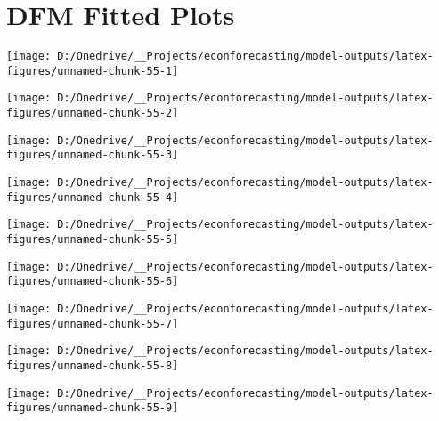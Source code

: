 \documentclass[11pt, letterpaper]{article}\usepackage[]{graphicx}\usepackage[]{color}
\begin{document}
\appendix
\appendixpage
\addappheadtotoc

\section{DFM Fitted Plots}


{\centering \texttt{[image: D:/Onedrive/\_\_Projects/econforecasting/model-outputs/latex-figures/unnamed-chunk-55-1]} 

}




{\centering \texttt{[image: D:/Onedrive/\_\_Projects/econforecasting/model-outputs/latex-figures/unnamed-chunk-55-2]} 

}




{\centering \texttt{[image: D:/Onedrive/\_\_Projects/econforecasting/model-outputs/latex-figures/unnamed-chunk-55-3]} 

}




{\centering \texttt{[image: D:/Onedrive/\_\_Projects/econforecasting/model-outputs/latex-figures/unnamed-chunk-55-4]} 

}




{\centering \texttt{[image: D:/Onedrive/\_\_Projects/econforecasting/model-outputs/latex-figures/unnamed-chunk-55-5]} 

}




{\centering \texttt{[image: D:/Onedrive/\_\_Projects/econforecasting/model-outputs/latex-figures/unnamed-chunk-55-6]} 

}




{\centering \texttt{[image: D:/Onedrive/\_\_Projects/econforecasting/model-outputs/latex-figures/unnamed-chunk-55-7]} 

}




{\centering \texttt{[image: D:/Onedrive/\_\_Projects/econforecasting/model-outputs/latex-figures/unnamed-chunk-55-8]} 

}




{\centering \texttt{[image: D:/Onedrive/\_\_Projects/econforecasting/model-outputs/latex-figures/unnamed-chunk-55-9]} 

}
\end{document}
